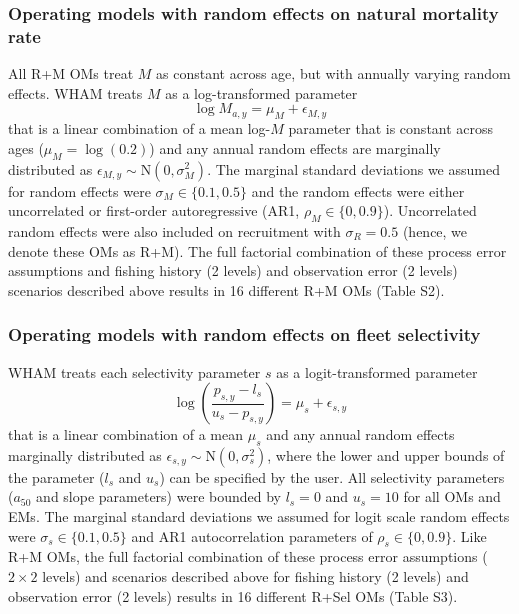 \documentclass[
  12pt,
]{article}
\begin{document}
\subsubsection*{Operating models with random effects on natural
mortality
rate}\label{operating-models-with-random-effects-on-natural-mortality-rate}

All R+M OMs treat \(M\) as constant across age, but with annually
varying random effects. WHAM treats \(M\) as a log-transformed parameter
\[
\log M_{a,y} = \mu_{M} + \epsilon_{M,y}
\] that is a linear combination of a mean log-\(M\) parameter that is
constant across ages (\(\mu_{M} = \log(0.2)\)) and any annual random
effects are marginally distributed as
\(\epsilon_{M,y} \sim \text{N}\left(0,\sigma_M^2\right)\). The marginal
standard deviations we assumed for random effects were
\(\sigma_M \in \{0.1, 0.5\}\) and the random effects were either
uncorrelated or first-order autoregressive (AR1,
\(\rho_M \in \{0,0.9\}\)). Uncorrelated random effects were also
included on recruitment with \(\sigma_R = 0.5\) (hence, we denote these
OMs as R+M). The full factorial combination of these process error
assumptions and fishing history (2 levels) and observation error (2
levels) scenarios described above results in 16 different R+M OMs (Table
S2).

\subsubsection*{Operating models with random effects on fleet
selectivity}\label{operating-models-with-random-effects-on-fleet-selectivity}

WHAM treats each selectivity parameter \(s\) as a logit-transformed
parameter \[
\log\left(\frac{p_{s,y}-l_{s}}{u_{s}-p_{s,y}}\right) = \mu_s + \epsilon_{s,y}
\] that is a linear combination of a mean \(\mu_s\) and any annual
random effects marginally distributed as
\(\epsilon_{s,y} \sim \text{N}\left(0,\sigma_s^2\right)\), where the
lower and upper bounds of the parameter (\(l_s\) and \(u_s\)) can be
specified by the user. All selectivity parameters (\(a_{50}\) and slope
parameters) were bounded by \(l_s = 0\) and \(u_s = 10\) for all OMs and
EMs. The marginal standard deviations we assumed for logit scale random
effects were \(\sigma_s \in \{0.1, 0.5\}\) and AR1 autocorrelation
parameters of \(\rho_s \in \{0,0.9\}\). Like R+M OMs, the full factorial
combination of these process error assumptions (\(2\times2\) levels) and
scenarios described above for fishing history (2 levels) and observation
error (2 levels) results in 16 different R+Sel OMs (Table S3).
\end{document}
